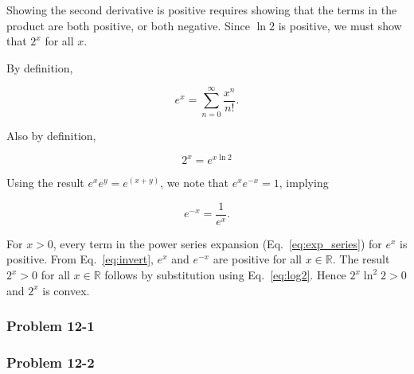 \documentclass{article}
\begin{document}
Showing the second derivative is positive requires showing that the
terms in the product are both positive, or both negative. Since $\ln 2$
is positive, we must show that $2^x$ for all $x$.

By definition,

\begin{equation}\label{eq:exp_series}
  e^x = \sum_{n=0}^\infty \frac{x^n}{n!}.
\end{equation}

Also by definition,

\begin{equation}\label{eq:log2}
  2^x = e^{x\ln 2}
\end{equation}

Using the result $e^xe^y = e^{(x+y)}$, we note that $e^xe^{-x} = 1$, implying

\begin{equation}\label{eq:invert}
  e^{-x} = \frac{1}{e^x}.
\end{equation}

For $x > 0$, every term in the power series expansion
(Eq.~\ref{eq:exp_series}) for $e^x$ is positive.
From Eq.~\ref{eq:invert}, $e^x$ and $e^{-x}$ are positive for all $x\in\mathbb{R}$. The result
$2^x > 0$ for all $x\in\mathbb{R}$ follows by substitution using
Eq.~\ref{eq:log2}. Hence $2^x\ln^2 2 > 0$ and $2^x$ is convex.

\begin{comment}
Substituting and expanding:

\begin{equation}
  2^x = 1 + x\ln 2 + \frac{x^2 \ln^2 2}{2!} + \frac{x^3 \ln^3 2}{3!} + \cdots.
\end{equation}

For $x > 0, 2^x$ is clearly positive. For $x = 0, 2^0 = 1$, again positive. When $x < 0$,

\begin{equation}
  2^{-x} = 1 - x\ln 2 + \frac{x^2 \ln^2 2}{2!} - \frac{x^3 \ln^3 2}{3!} + \frac{x^4 \ln^4 2}{4!}
  - \frac{x^5 \ln^5 2}{5!} + \cdots.
\end{equation}
\end{comment}


\subsubsection{Problem 12-1}

\subsubsection{Problem 12-2}
\end{document}
